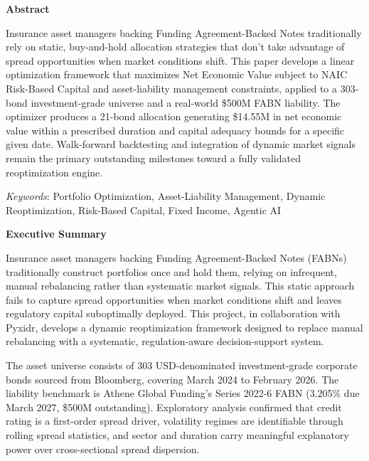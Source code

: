 \documentclass[12pt]{article}
\begin{document}
\begin{center}
{\bfseries\fontsize{14}{17}\selectfont Abstract}
\end{center}

\noindent Insurance asset managers backing Funding Agreement-Backed Notes traditionally rely on static, buy-and-hold allocation strategies that don't take advantage of spread opportunities when market conditions shift. This paper develops a linear optimization framework that maximizes Net Economic Value subject to NAIC Risk-Based Capital and asset-liability management constraints, applied to a 303-bond investment-grade universe and a real-world \$500M FABN liability. The optimizer produces a 21-bond allocation generating \$14.55M in net economic value within a prescribed duration and capital adequacy bounds for a specific given date. Walk-forward backtesting and integration of dynamic market signals remain the primary outstanding milestones toward a fully validated reoptimization engine.

\vspace{1in}
\noindent \textit{Keywords}: Portfolio Optimization, Asset-Liability Management, Dynamic Reoptimization, Risk-Based Capital, Fixed Income, Agentic AI

\newpage
\setcounter{page}{2}

\begin{center}
{\bfseries\fontsize{14}{17}\selectfont Executive Summary}
\end{center}

Insurance asset managers backing Funding Agreement-Backed Notes (FABNs) traditionally construct portfolios once and hold them, relying on infrequent, manual rebalancing rather than systematic market signals. This static approach fails to capture spread opportunities when market conditions shift and leaves regulatory capital suboptimally deployed. This project, in collaboration with Pyxidr, develops a dynamic reoptimization framework designed to replace manual rebalancing with a systematic, regulation-aware decision-support system.

The asset universe consists of 303 USD-denominated investment-grade corporate bonds sourced from Bloomberg, covering March 2024 to February 2026. The liability benchmark is Athene Global Funding's Series 2022-6 FABN (3.205\% due March 2027, \$500M outstanding). Exploratory analysis confirmed that credit rating is a first-order spread driver, volatility regimes are identifiable through rolling spread statistics, and sector and duration carry meaningful explanatory power over cross-sectional spread dispersion.
\end{document}
